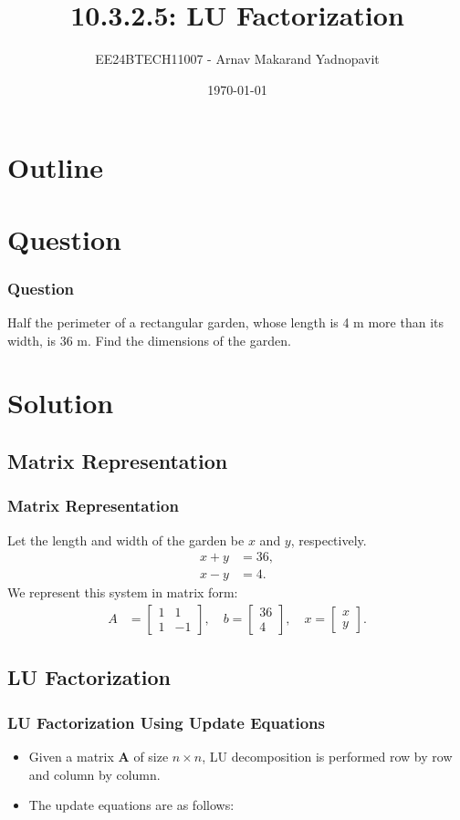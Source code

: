 \documentclass{beamer}
\title{10.3.2.5: LU Factorization}
\author{EE24BTECH11007 - Arnav Makarand Yadnopavit}
\date{\today}
\numberwithin{equation}{section}
\begin{document}
\begin{frame}
\titlepage
\end{frame}

\section*{Outline}
\begin{frame}
\tableofcontents
\end{frame}

\section{Question}
\begin{frame}
\frametitle{Question}
Half the perimeter of a rectangular garden, whose length is 4 m more than its width, is 36 m. Find the dimensions of the garden.
\end{frame}

\section{Solution}
\subsection{Matrix Representation}
\begin{frame}
\frametitle{Matrix Representation}
Let the length and width of the garden be $x$ and $y$, respectively.
\begin{align*}
    x + y &= 36, \\
    x - y &= 4.
\end{align*}
We represent this system in matrix form:
\begin{align*}
    A &= \begin{bmatrix} 1 & 1 \\ 1 & -1 \end{bmatrix}, \quad
    b = \begin{bmatrix} 36 \\ 4 \end{bmatrix}, \quad
    x = \begin{bmatrix} x \\ y \end{bmatrix}.
\end{align*}
\end{frame}

\subsection{LU Factorization}
\begin{frame}
\frametitle{LU Factorization Using Update Equations}
\begin{itemize}
    \item Given a matrix $\mathbf{A}$ of size $n \times n$, LU decomposition is performed row by row and column by column.
    \item The update equations are as follows:
\end{itemize}
\end{frame}
\end{document}
